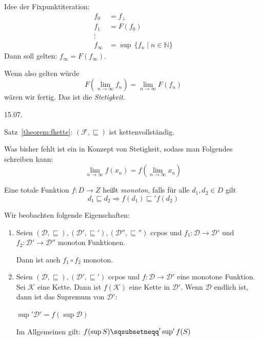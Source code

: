 Idee der Fixpunktiteration: \begin{align*}
    f_0 & = f_{\bot} \\
    f_1 & = F(f_0) \\
    \vdots \\
    f_{\infty} & = \sup \, \{ f_n \mid n \in \mathbb{N} \}
\end{align*}
Dann soll gelten: $f_{\infty} = F(f_{\infty})$.

Wenn also gelten würde \[
    F\left(\lim_{n \to \infty} f_n\right) = \lim_{n \to \infty} F(f_n)
\] wären wir fertig. Das ist die \emph{Stetigkeit}.



\newpage
\hfill 15.07.

\begin{remark}
    Satz~\ref{theorem:fkette}: $(\mathcal{F}, \sqsubseteq)$ ist kettenvollständig.

    Was bisher fehlt ist ein in Konzept von Stetigkeit, sodass man Folgendes schreiben kann: \[
        \lim_{n \to \infty} f(x_n) = f\left(\lim_{n \to \infty} x_n\right)
    \]
\end{remark}


\par\medskip
\begin{definition}[Monotonie]
    Eine totale Funktion $f: D \to Z$ heißt \emph{monoton}, falls für alle $d_1, d_2 \in D$ gilt \[
        d_1 \sqsubseteq d_2 \Rightarrow f(d_1) \sqsubseteq' f(d_2)
    \]
\end{definition}

\begin{observations}
    Wir beobachten folgende Eigenschaften:
    \begin{enumerate}
        \item Seien $(\mathcal{D}, \sqsubseteq), (\mathcal{D}',\sqsubseteq'), (\mathcal{D}'',\sqsubseteq'')$ ccpos und $f_1: \mathcal{D} \to \mathcal{D}'$ und $f_2: \mathcal{D}' \to \mathcal{D}''$ monoton Funktionen.

            Dann ist auch $f_1 \circ f_2$ monoton.
        \item Seien $(\mathcal{D}, \sqsubseteq), (\mathcal{D}',\sqsubseteq')$ ccpos und $f: \mathcal{D} \to \mathcal{D}'$ eine monotone Funktion. Sei $\mathcal{K}$ eine Kette. Dann ist $f(\mathcal{K})$ eine Kette in $\mathcal{D}'$. Wenn $\mathcal{D}$ endlich ist, dann ist das Supremum von $\mathcal{D}'$:
            \begin{center}
                $\sup' \mathcal{D}' = f(\sup \mathcal{D})$
            \end{center}

            Im Allgemeinen gilt: $f(\sup S) \sqsubsetneqq' \sup' f(S)$
    \end{enumerate}
\end{observations}


